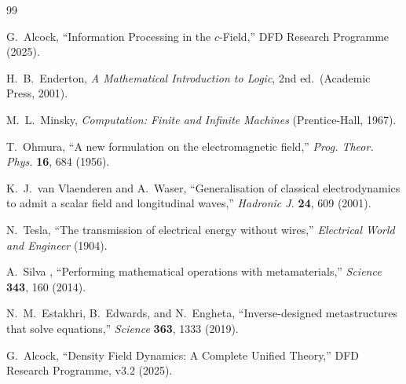 \documentclass[aps,prd,twocolumn,superscriptaddress,nofootinbib,floatfix]{revtex4-2}
\begin{document}
\begin{thebibliography}{99}

G.~Alcock, ``Information Processing in the $c$-Field,''
DFD Research Programme (2025).

H.~B.~Enderton, \textit{A Mathematical Introduction to Logic},
2nd ed.\ (Academic Press, 2001).

M.~L.~Minsky, \textit{Computation: Finite and Infinite Machines}
(Prentice-Hall, 1967).

T.~Ohmura, ``A new formulation on the electromagnetic field,''
\textit{Prog. Theor. Phys.} \textbf{16}, 684 (1956).

K.~J.~van Vlaenderen and A.~Waser, ``Generalisation of classical
electrodynamics to admit a scalar field and longitudinal waves,''
\textit{Hadronic J.} \textbf{24}, 609 (2001).

N.~Tesla, ``The transmission of electrical energy without wires,''
\textit{Electrical World and Engineer} (1904).

A.~Silva \etal, ``Performing mathematical operations with
metamaterials,'' \textit{Science} \textbf{343}, 160 (2014).

N.~M.~Estakhri, B.~Edwards, and N.~Engheta, ``Inverse-designed
metastructures that solve equations,'' \textit{Science}
\textbf{363}, 1333 (2019).

G.~Alcock, ``Density Field Dynamics: A Complete Unified Theory,''
DFD Research Programme, v3.2 (2025).

\end{thebibliography}
\end{document}
